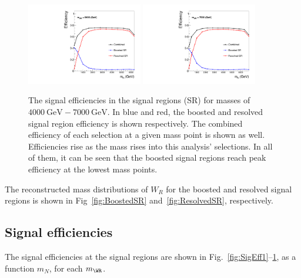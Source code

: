 \begin{figure}[htbp]
  \includegraphics[width=0.45\textwidth]{figures/SigEff/WR6400.pdf}
  \hspace{0.01\textwidth}
  \includegraphics[width=0.45\textwidth]{figures/SigEff/WR7000.pdf}
  \caption[Signal Efficiencies for -7000]{
    The signal efficiencies in the signal regions (SR) for \WR masses of \ensuremath{\SI{4000}{\GeV}-\SI{7000}{\GeV}}. In blue and red, the boosted and resolved signal region efficiency is shown respectively. The combined efficiency of each selection at a given mass point is shown as well. Efficiencies rise as the \WR mass rises into this analysis' selections. In all of them, it can be seen that the boosted signal regions reach peak efficiency at the lowest \NR mass points.
  }
  
  \label{fig:SigEff2}
\end{figure}

The reconstructed mass distributions of $W_{R}$ for the boosted and resolved signal regions is shown in  Fig~\ref{fig:BoostedSR} and~\ref{fig:ResolvedSR}, respectively.

\subsection{Signal efficiencies}
The signal efficiencies at the signal regions are shown in Fig.~\ref{fig:SigEff1}--\ref{fig:SigEff2},
as a function $m_{N}$, for each $m_{\WR}$.








